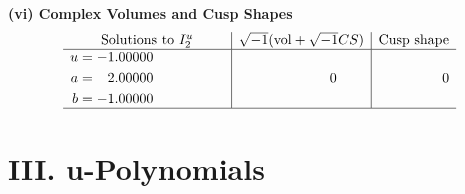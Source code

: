 \documentclass[1p]{elsarticle_modified}
\theoremstyle{definition}
\newcommand{\I}{\sqrt{-1}}
\begin{document}
\newpage\flushleft \textbf{(vi) Complex Volumes and Cusp Shapes}
$$\begin{array}{c|c|c}  
\text{Solutions to }I^u_{2}& \I (\text{vol} + \sqrt{-1}CS) & \text{Cusp shape}\\
 \hline 
\begin{aligned}
u &= -1.00000\phantom{ +0.000000I} \\
a &= \phantom{-}2.00000\phantom{ +0.000000I} \\
b &= -1.00000\phantom{ +0.000000I}\end{aligned}
 & \phantom{-0.000000 } 0 & \phantom{-0.000000 } 0\\
 \hline 
 \end{array}$$\newpage
\newpage\renewcommand{\arraystretch}{1}
\centering \section*{ III. u-Polynomials}
\end{document}
